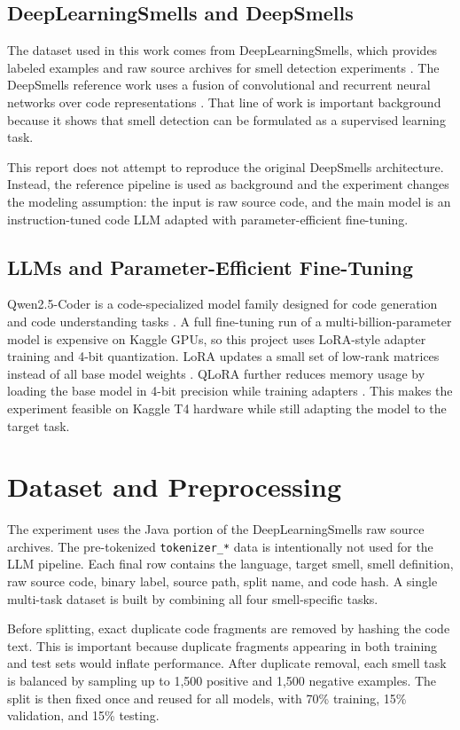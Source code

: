 \documentclass[11pt,a4paper]{article}
\begin{document}
\subsection{DeepLearningSmells and DeepSmells}
The dataset used in this work comes from DeepLearningSmells, which provides labeled examples and raw source archives for smell detection experiments \cite{deeplearningsmells}. The DeepSmells reference work uses a fusion of convolutional and recurrent neural networks over code representations \cite{deepsmells}. That line of work is important background because it shows that smell detection can be formulated as a supervised learning task.

This report does not attempt to reproduce the original DeepSmells architecture. Instead, the reference pipeline is used as background and the experiment changes the modeling assumption: the input is raw source code, and the main model is an instruction-tuned code LLM adapted with parameter-efficient fine-tuning.

\subsection{LLMs and Parameter-Efficient Fine-Tuning}
Qwen2.5-Coder is a code-specialized model family designed for code generation and code understanding tasks \cite{qwen25coder,qwen25coder3b}. A full fine-tuning run of a multi-billion-parameter model is expensive on Kaggle GPUs, so this project uses LoRA-style adapter training and 4-bit quantization. LoRA updates a small set of low-rank matrices instead of all base model weights \cite{hu2022lora}. QLoRA further reduces memory usage by loading the base model in 4-bit precision while training adapters \cite{dettmers2023qlora}. This makes the experiment feasible on Kaggle T4 hardware while still adapting the model to the target task.

\section{Dataset and Preprocessing}
The experiment uses the Java portion of the DeepLearningSmells raw source archives. The pre-tokenized \texttt{tokenizer\_*} data is intentionally not used for the LLM pipeline. Each final row contains the language, target smell, smell definition, raw source code, binary label, source path, split name, and code hash. A single multi-task dataset is built by combining all four smell-specific tasks.

Before splitting, exact duplicate code fragments are removed by hashing the code text. This is important because duplicate fragments appearing in both training and test sets would inflate performance. After duplicate removal, each smell task is balanced by sampling up to 1,500 positive and 1,500 negative examples. The split is then fixed once and reused for all models, with 70\% training, 15\% validation, and 15\% testing.
\end{document}
